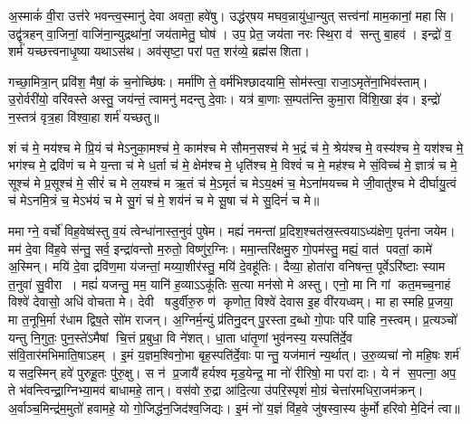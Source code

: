 अ॒स्माकं॑ वी॒रा उत्त॑रे भवन्त्व॒स्मानु॑ देवा अवता॒ हवे॑षु। उद्ध॑र्‌षय मघव॒न्नायु॑धा॒न्युत् सत्त्व॑नां माम॒कानां॒ महासि। उद्वृ॑त्रहन् वा॒जिनां॒ वाजि॑ना॒न्युद्रथा॑नां॒ जय॑तामेतु॒ घोष॑। उप॒ प्रेत॒ जय॑ता नरः स्थि॒रा व॑ सन्तु बा॒हव॑। इन्द्रो॑ व॒ शर्म॑ यच्छत्त्वनाधृ॒ष्या यथाऽस॑थ। अव॑सृष्टा॒ परा॑ पत॒ शर॑व्ये॒ ब्रह्म॑सशिता।

गच्छा॒मित्रा॒न् प्रवि॑श॒ मैषां॒ कं च॒नोच्छि॑षः। मर्मा॑णि ते॒ वर्म॑भिश्छादयामि॒ सोम॑स्त्वा॒ राजा॒ऽमृते॑ना॒भिव॑स्ताम्। उ॒रोर्वरी॑यो॒ वरि॑वस्ते अस्तु॒ जय॑न्तं॒ त्वामनु॑ मदन्तु दे॒वाः। यत्र॑ बा॒णाः स॒म्पत॑न्ति कुमा॒रा वि॑शि॒खा इ॑व। इन्द्रो॑ न॒स्तत्र॑ वृत्र॒हा वि॑श्वा॒हा शर्म॑ यच्छतु॥

शं च॑ मे॒ मय॑श्च मे प्रि॒यं च॑ मेऽनुका॒मश्च॑ मे॒ काम॑श्च मे सौमन॒सश्च॑ मे भ॒द्रं च॑ मे॒ श्रेय॑श्च मे॒ वस्य॑श्च मे॒ यश॑श्च मे॒ भग॑श्च मे॒ द्रवि॑णं च मे य॒न्ता च॑ मे ध॒र्ता च॑ मे॒ क्षेम॑श्च मे॒ धृति॑श्च मे॒ विश्वं॑ च मे॒ मह॑श्च मे सं॒विच्च॑ मे॒ ज्ञात्रं॑ च मे॒ सूश्च॑ मे प्र॒सूश्च॑ मे॒ सीरं॑ च मे ल॒यश्च॑ म ऋ॒तं च॑ मे॒ऽमृतं॑ च मेऽय॒क्ष्मं च॒ मेऽना॑मयच्च मे जी॒वातु॑श्च मे दीर्घायु॒त्वं च॑ मेऽनमि॒त्रं च॒ मेऽभ॑यं च मे सु॒गं च॑ मे॒ शय॑नं च मे सू॒षा च॑ मे सु॒दिनं॑ च मे॥

ममाग्ने॒ वर्चो॑ विह॒वेष्व॑स्तु व॒यं त्वेन्धा॑नास्त॒नुवं॑ पुषेम। मह्यं॑ नमन्तां प्र॒दिश॒श्चत॑स्र॒स्त्वयाऽध्य॑क्षेण॒ पृत॑ना जयेम। मम॑ दे॒वा वि॑ह॒वे स॑न्तु॒ सर्व॒ इन्द्रा॑वन्तो म॒रुतो॒ विष्णु॑र॒ग्निः। ममा॒न्तरि॑क्षमु॒रु गो॒पम॑स्तु॒ मह्यं॒ वात॑ पवतां॒ कामे॑ अ॒स्मिन्। मयि॑ दे॒वा द्रवि॑ण॒मा य॑जन्तां॒ मय्या॒शीर॑स्तु॒ मयि॑ दे॒वहू॑तिः। दैव्या॒ होता॑रा वनिषन्त॒ पूर्वेऽरि॑ष्टाः स्याम त॒नुवा॑ सु॒वीरा। मह्यं॑ यजन्तु॒ मम॒ यानि॑ ह॒व्याऽऽकू॑तिः स॒त्या मन॑सो मे अस्तु। एनो॒ मा नि गां कत॒मच्च॒नाहं विश्वे॑ देवासो॒ अधि॑ वोचता मे। देवी षडुर्वीरु॒रु ण॑ कृणोत॒ विश्वे॑ देवास इ॒ह वी॑रयध्वम्। मा हास्महि प्र॒जया॒ मा त॒नूभि॒र्मा र॑धाम द्विष॒ते सो॑म राजन्। अ॒ग्निर्म॒न्युं प्र॑तिनु॒दन् पु॒रस्ताद॒ब्धो गो॒पाः परि॑ पाहि न॒स्त्वम्। प्र॒त्यञ्चो॑ यन्तु नि॒गुतः॒ पुन॒स्ते॑ऽमैषां चि॒त्तं प्र॒बुधा॒ वि ने॑शत्। धा॒ता धा॑तृ॒णां भुव॑नस्य॒ यस्पति॑र्दे॒व स॑वि॒तार॑मभिमाति॒षाऽहम्। इ॒मं य॒ज्ञम॒श्विनो॒भा बृह॒स्पति॑र्दे॒वाः पान्तु॒ यज॑मानं न्य॒र्थात्। उ॒रु॒व्यचा॑ नो महि॒षः शर्म॑ यसद॒स्मिन् हवे॑ पुरुहू॒तः पु॑रु॒क्षु। स न॑ प्र॒जायै॑ हर्यश्व मृड॒येन्द्र॒ मा नो॑ रीरिषो॒ मा परा॑ दाः। ये न॑ स॒पत्ना॒ अप॒ ते भ॑वन्त्विन्द्रा॒ग्निभ्या॒मव॑ बाधामहे॒ तान्। वस॑वो रु॒द्रा आ॑दि॒त्या उ॑परि॒स्पृशं॑ मो॒ग्रं चेत्ता॑रमधिरा॒जम॑क्रन्। अ॒र्वाञ्च॒मिन्द्र॑म॒मुतो॑ हवामहे॒ यो गो॒जिद्ध॑न॒जिद॑श्व॒जिद्यः। इ॒मं नो॑ य॒ज्ञं वि॑ह॒वे जु॑षस्वा॒स्य कु॑र्मो हरिवो मे॒दिनं॑ त्वा॥

